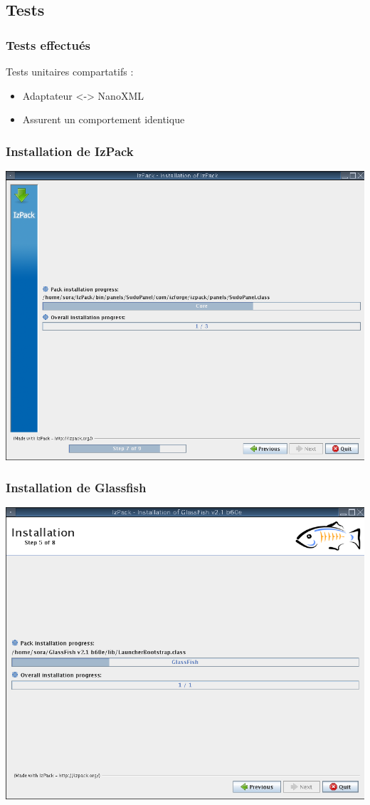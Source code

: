 \subsection{Tests}
\begin{frame}\frametitle{Tests effectués}
\begin{minipage}[c]{.9\linewidth}
Tests unitaires compartatifs :
\begin{itemize}
	\item Adaptateur <-> NanoXML
	\item Assurent un comportement identique
\end{itemize}
\end{minipage}
\end{frame}
\begin{frame}\frametitle{Installation de IzPack}
	\centering
	\includegraphics[width=\linewidth]{../image/installationIzpack.png}
\end{frame}
\begin{frame}\frametitle{Installation de Glassfish}
	\centering
	\includegraphics[width=\linewidth]{../image/installationGlassfish.png}
\end{frame}
